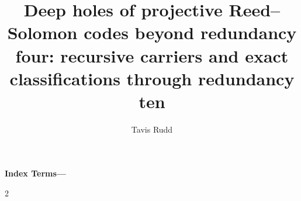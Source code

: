 \documentclass[11pt]{article}
\title{Deep holes of projective Reed--Solomon codes beyond redundancy four:
recursive carriers and exact classifications through redundancy ten}
\author{Tavis Rudd}
\date{}
\theoremstyle{upright}
\theoremstyle{definition}
\theoremstyle{remark}
\begin{document}
\raggedbottom
\maketitle

\begin{abstract}

\end{abstract}
\noindent\textbf{Index Terms---}












\appendix





\clearpage
\begingroup
\scriptsize
\raggedright
\begin{multicols}{2}


\end{multicols}
\endgroup
\end{document}
